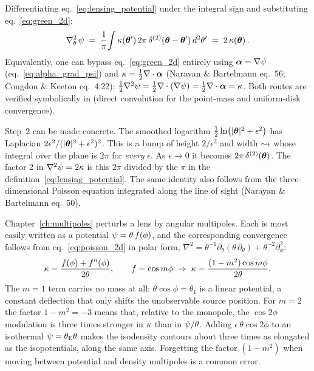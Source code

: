 Differentiating eq.~\eqref{eq:lensing_potential} under the integral
sign and substituting eq.~\eqref{eq:green_2d}:
\begin{equation}
    \nabla^2_\theta\, \psi
    \;=\; \frac{1}{\pi}\!\int \kappa(\boldsymbol{\theta}')\,
        2\pi\,\delta^{(2)}(\boldsymbol{\theta} - \boldsymbol{\theta}')\,d^2\theta'
    \;=\; 2\,\kappa(\boldsymbol{\theta}) \,.
    \label{eq:poisson_derivation}
\end{equation}
Equivalently, one can bypass eq.~\eqref{eq:green_2d} entirely using
$\boldsymbol{\alpha} = \nabla\psi$ (eq.~\ref{eq:alpha_grad_psi}) and
$\kappa = \frac{1}{2}\nabla\cdot\boldsymbol{\alpha}$ (Narayan \& Bartelmann
eq.~56; Congdon \& Keeton eq.~4.22):
$\frac{1}{2}\nabla^2\psi = \frac{1}{2}\nabla\cdot(\nabla\psi) =
\frac{1}{2}\nabla\cdot\boldsymbol{\alpha} = \kappa$.
Both routes are verified symbolically in
(direct convolution for the point-mass and uniform-disk convergence).
\begin{annotation}
Step~2 can be made concrete. The smoothed logarithm
$\tfrac12\ln(|\boldsymbol{\theta}|^2 + \epsilon^2)$ has Laplacian
$2\epsilon^2/(|\boldsymbol{\theta}|^2 + \epsilon^2)^2$. This is a bump of height
$2/\epsilon^2$ and width $\sim\epsilon$ whose integral over the plane is
$2\pi$ for \emph{every} $\epsilon$. As $\epsilon \to 0$ it becomes
$2\pi\,\delta^{(2)}(\boldsymbol{\theta})$. The factor 2 in $\nabla^2\psi = 2\kappa$ is
this $2\pi$ divided by the $\pi$ in the definition~\eqref{eq:lensing_potential}.
The same identity also follows from the three-dimensional Poisson equation
integrated along the line of sight (Narayan \& Bartelmann eq.~50).
\end{annotation}
\begin{bridge}
Chapter~\ref{ch:multipoles} perturbs a lens by angular multipoles. Each is
most easily written as a potential $\psi = \theta\,f(\phi)$, and the
corresponding convergence follows from eq.~\eqref{eq:poisson_2d} in polar form,
$\nabla^2 = \theta^{-1}\partial_\theta(\theta\,\partial_\theta) + \theta^{-2}\partial_\phi^2$:
\begin{equation*}
    \kappa = \frac{f(\phi) + f''(\phi)}{2\theta},
    \qquad
    f = \cos m\phi \;\Rightarrow\; \kappa = \frac{(1 - m^2)\cos m\phi}{2\theta}.
\end{equation*}
The $m = 1$ term carries no mass at all: $\theta\cos\phi = \theta_1$ is a
linear potential, a constant deflection that only shifts the unobservable
source position. For $m = 2$ the factor $1 - m^2 = -3$ means that, relative to the
monopole, the $\cos 2\phi$ modulation is three times stronger in $\kappa$
than in $\psi/\theta$. Adding $\epsilon\,\theta\cos2\phi$ to an
isothermal $\psi = \theta_{\mathrm{E}}\theta$ makes the isodensity contours about three
times as elongated as the isopotentials, along the same axis. Forgetting the
factor $(1 - m^2)$ when moving between potential and density multipoles is a
common error.
\end{bridge}



